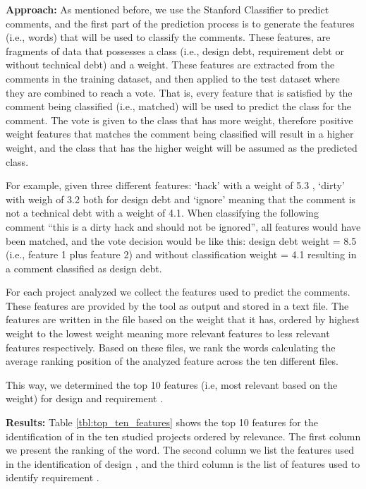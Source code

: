 \vspace{1mm}
\noindent \textbf{Approach:} As mentioned before, we use the Stanford Classifier to predict \SATD comments, and the first part of the prediction process is to generate the features (i.e., words) that will be used to classify the comments. These features, are fragments of data that possesses a class (i.e., design debt, requirement debt or without technical debt) and a weight. These features are extracted from the comments in the training dataset, and then applied to the test dataset where they are combined to reach a vote. That is, every feature that is satisfied by the comment being classified (i.e., matched) will be used to predict the class for the comment. The vote is given to the class that has more weight, therefore positive weight features that matches the comment being classified will result in a higher weight, and the class that has the higher weight will be assumed as the predicted class.

For example, given three different features: `hack' with a weight of 5.3 , `dirty' with weigh of 3.2 both for design debt and `ignore' meaning that the comment is not a technical debt with a weight of 4.1. When classifying the following comment ``this is a dirty hack and should not be ignored'', all features would have been matched, and the vote decision would be like this: design debt weight = 8.5 (i.e., feature 1 plus feature 2) and without classification weight = 4.1 resulting in a comment classified as  design debt.

For each project analyzed we collect the features used to predict the \SATD comments. These features are provided by the tool as output and stored in a text file. The features are written in the file based on the weight that it has, ordered by highest weight to the lowest weight meaning more relevant features to less relevant features respectively. Based on these files, we rank the words calculating the average ranking position of the analyzed feature across the ten different files. 

This way, we determined the top 10 features (i.e, most relevant based on the weight) for design \SATD and requirement \SATD.

\vspace{1mm}
\noindent \textbf{Results:} Table \ref{tbl:top_ten_features} shows the top 10 features for the identification of \SATD in the ten studied projects ordered by relevance. The first column we  present the ranking of the word. The second column we list the features used in the identification of design \SATD, and the third column is the list of features used to identify requirement \SATD.

